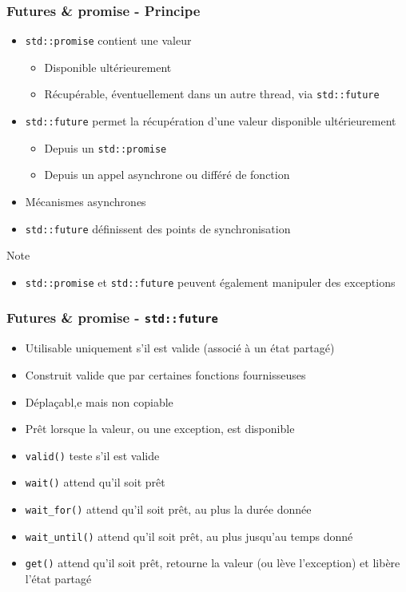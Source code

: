 \documentclass[C++.tex]{subfiles}
\begin{document}
\begin{frame}[fragile]
	\frametitle{Futures \& promise - Principe}
	\begin{itemize}
		\item \lstinline|std::promise| contient une valeur
		\begin{itemize}
			\item Disponible ultérieurement
			\item Récupérable, éventuellement dans un autre thread, via \lstinline|std::future|
		\end{itemize}
		\item \lstinline|std::future| permet la récupération d'une valeur disponible ultérieurement
		\begin{itemize}
			\item Depuis un \lstinline|std::promise|
			\item Depuis un appel asynchrone ou différé de \og fonction\fg{}
		\end{itemize}
		\item Mécanismes asynchrones
		\item \lstinline|std::future| définissent des points de synchronisation
	\end{itemize}

	\begin{block}{Note}
		\begin{itemize}
			\item \lstinline|std::promise| et \lstinline|std::future| peuvent également manipuler des exceptions
		\end{itemize}
	\end{block}
\end{frame}

\begin{frame}[fragile]
	\frametitle{Futures \& promise - \lstinline|std::future|}
	\begin{itemize}
		\item Utilisable uniquement s'il est valide (associé à un état partagé)
		\item Construit valide que par certaines fonctions \og fournisseuses\fg{}
		\item Déplaçabl,e mais non copiable
		\item Prêt lorsque la valeur, ou une exception, est disponible
		\item \lstinline|valid()| teste s'il est valide
		\item \lstinline|wait()| attend qu'il soit prêt
		\item \lstinline|wait_for()| attend qu'il soit prêt, au plus la durée donnée
		\item \lstinline|wait_until()| attend qu'il soit prêt, au plus jusqu'au temps donné
		\item \lstinline|get()| attend qu'il soit prêt, retourne la valeur (ou lève l'exception) et libère l'état partagé
	\end{itemize}
\end{frame}
\end{document}
